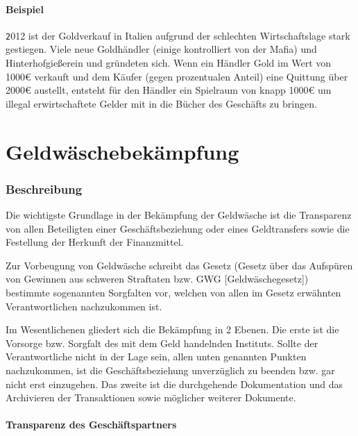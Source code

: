 \documentclass{article}
\begin{document}
        \subsection[Beispiel]{Beispiel}

            \texttt
            2012 ist der Goldverkauf in Italien aufgrund der schlechten Wirtschaftslage stark gestiegen.
            \cite{GoldItalien}
            Viele neue Goldhändler (einige kontrolliert von der Mafia) und Hinterhofgießerein und gründeten sich.
            Wenn ein Händler Gold im Wert von 1000€ verkauft und dem Käufer (gegen prozentualen Anteil) eine Quittung über 2000€ austellt, entsteht für den Händler ein Spielraum von knapp 1000€ um illegal erwirtschaftete Gelder mit in die Bücher des Geschäfts zu bringen.

\newpage

\part[Bekämpfung]{Geldwäschebekämpfung}

    \section[Beschreibung]{Beschreibung}

        Die wichtigste Grundlage in der Bekämpfung der Geldwäsche ist die Transparenz von allen Beteiligten einer Geschäftsbeziehung oder eines Geldtransfers sowie die Festellung der Herkunft der Finanzmittel.

        Zur Vorbeugung von Geldwäsche schreibt das Gesetz (Gesetz über das Aufspüren von Gewinnen aus schweren Straftaten bzw. GWG [Geldwäschegesetz]) bestimmte sogenannten Sorgfalten vor, welchen von allen im Gesetz erwähnten Verantwortlichen nachzukommen ist.

        Im Wesentlichenen gliedert sich die Bekämpfung in 2 Ebenen. Die erste ist die Vorsorge bzw. Sorgfalt des mit dem Geld handelnden Instituts. Sollte der Verantwortliche nicht in der Lage sein, allen unten genannten Punkten nachzukommen, ist die Geschäftsbeziehung unverzüglich zu beenden bzw. gar nicht erst einzugehen. 
        Das zweite ist die durchgehende Dokumentation und das Archivieren der Transaktionen sowie möglicher weiterer Dokumente.

        \subsection[Transparenz des Geschäftspartners]{Transparenz des Geschäftspartners}
\end{document}
